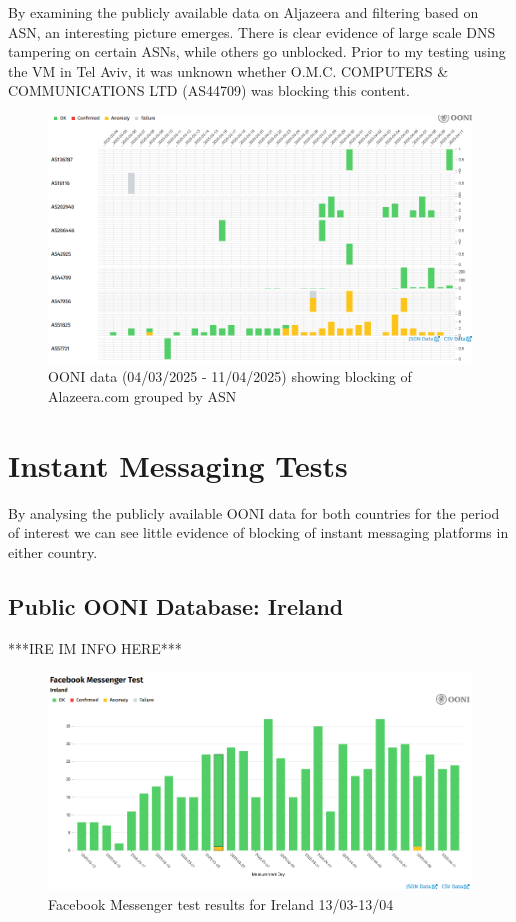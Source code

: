 By examining the publicly available data on Aljazeera and filtering based on ASN, an interesting picture emerges. There is clear evidence of large scale DNS tampering on certain ASNs, while others go unblocked. Prior to my testing using the VM in Tel Aviv, it was unknown whether O.M.C. COMPUTERS \& COMMUNICATIONS LTD (AS44709) was blocking this content. 

\begin{figure} [H]
    \centering
    \includegraphics[width=1\linewidth]{ALJZRbyASN.png}
    \caption{OONI data (04/03/2025 - 11/04/2025) showing blocking of Alazeera.com grouped by ASN}
    \label{fig:enter-label}
\end{figure}



\section{Instant Messaging Tests}
By analysing the publicly available OONI data for both countries for the period of interest we can see little evidence of blocking of instant messaging platforms in either country.

\subsection{Public OONI Database: Ireland}
***IRE IM INFO HERE***

\begin{figure} [H]
    \centering
    \includegraphics[width=0.5\linewidth]{IREOONIDBIMFB.png}
    \caption{Facebook Messenger test results for Ireland 13/03-13/04}
    \label{fig:enter-label}
\end{figure}

